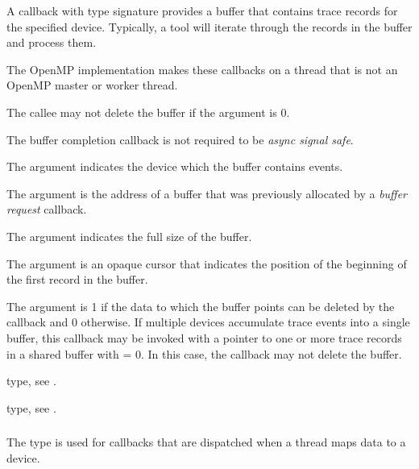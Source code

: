 \descr
A callback with type signature  provides 
a buffer that contains trace records for the specified device. Typically, a tool 
will iterate through the records in the buffer and process them.

The OpenMP implementation makes these callbacks on a thread that is not an 
OpenMP master or worker thread.

The callee may not delete the buffer if the  argument is 0.

The buffer completion callback is not required to be \emph{async signal safe}.

\argdesc
The  argument indicates the device which the buffer contains events.

The  argument is the address of a buffer that was previously
allocated by a \emph{buffer request} callback.

The  argument indicates the full size of the buffer.

The  argument is an opaque cursor that indicates the position 
of the beginning of the first record in the buffer.

The  argument is 1 if the data to which the buffer points
can be deleted by the callback and 0 otherwise. If multiple devices accumulate 
trace events into a single buffer, this callback may be invoked with a pointer 
to one or more trace records in a shared buffer with  = 0. 
In this case, the callback may not delete the buffer.

\begin{crossrefs}
\item {} type, see .

\item {} type, see .
\end{crossrefs}



\subsubsection{}
\label{sec:ompt_callback_target_data_op_t}
\summary
The  type is used for callbacks that are
dispatched when a thread maps data to a device.

